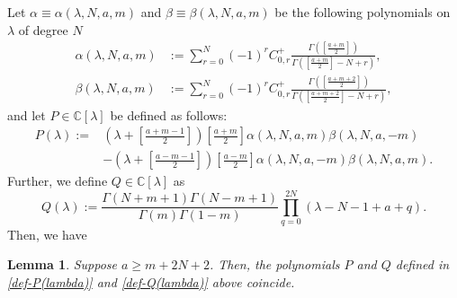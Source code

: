 \documentclass[12pt, pdflatex, a4paper]{article}
\theoremstyle{plain}
\newtheorem{lemma}[thm]{Lemma}
\theoremstyle{definition}
\def\C{{\mathbb C}}
\begin{document}
Let $\alpha \equiv \alpha(\lambda, N, a, m)$ and $\beta \equiv \beta(\lambda, N, a, m)$ be the following polynomials on $\lambda$ of degree $N$
\begin{align}
\label{def-alpha}
\alpha(\lambda, N, a, m) &:= \sum_{r = 0}^{N}(-1)^r C_{0,r}^+\frac{\Gamma\left(\left[\frac{a+m}{2}\right]\right)}{\Gamma\left(\left[\frac{a+m}{2}\right]-N+r\right)},\\
\label{def-beta}
\beta(\lambda, N, a, m) &:= \sum_{r = 0}^{N}(-1)^r C_{0,r}^+\frac{\Gamma\left(\left[\frac{a+m+2}{2}\right]\right)}{\Gamma\left(\left[\frac{a+m+2}{2}\right]-N+r\right)},
\end{align}
and let $P \in \C[\lambda]$ be defined as follows:
\begin{equation}\label{def-P(lambda)}
\begin{aligned}
P(\lambda):= &\left(\lambda+\left[\frac{a+m-1}{2}\right]\right)\left[\frac{a+m}{2}\right]\alpha(\lambda, N, a, m)\beta(\lambda, N, a, -m)\\
&- \left(\lambda+\left[\frac{a-m-1}{2}\right]\right)\left[\frac{a-m}{2}\right]\alpha(\lambda, N, a, -m)\beta(\lambda, N, a, m).
\end{aligned}
\end{equation}
Further, we define $Q \in \C[\lambda]$ as
\begin{equation}\label{def-Q(lambda)}
Q(\lambda) := \frac{\Gamma(N+m+1)\Gamma(N-m+1)}{\Gamma(m)\Gamma(1-m)}\prod_{q=0}^{2N}(\lambda-N-1+a+q).
\end{equation}
Then, we have
\begin{lemma}\label{lemma-P=Q}
Suppose $a \geq m+2N+2$. Then, the polynomials $P$ and $Q$ defined in \eqref{def-P(lambda)} and \eqref{def-Q(lambda)} above coincide.
\end{lemma}
\end{document}
